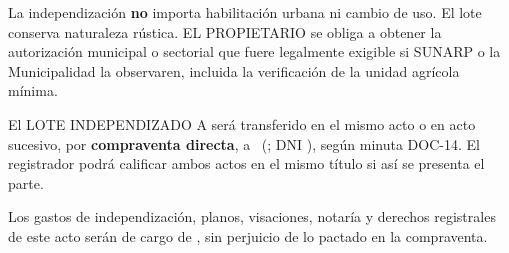 \documentclass[12pt,a4paper]{article}
\begin{document}
La independización \textbf{no} importa habilitación urbana ni cambio de uso. El lote conserva naturaleza rústica. EL PROPIETARIO se obliga a obtener la autorización municipal o sectorial que fuere legalmente exigible si SUNARP o la Municipalidad la observaren, incluida la verificación de la unidad agrícola mínima.

El LOTE INDEPENDIZADO A será transferido en el mismo acto o en acto sucesivo, por \textbf{compraventa directa}, a \CompradorNombreCompleto\ (\CompradorParentesco; DNI \CompradorDNI), según minuta DOC-14. El registrador podrá calificar ambos actos en el mismo título si así se presenta el parte.

Los gastos de independización, planos, visaciones, notaría y derechos registrales de este acto serán de cargo de , sin perjuicio de lo pactado en la compraventa.

\CierreMinuta
\LugarFecha

\vspace{0.15em}
\noindent
{}

\vspace{0.55em}
\\[0.35em]
\\[0.2em]
\noindent
{}
\end{document}
